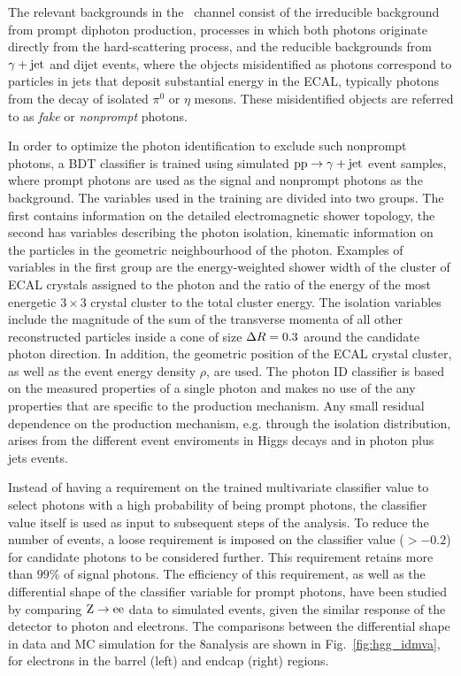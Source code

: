 \documentclass[11pt,twoside,a4paper,cmspaper,final,collab]{cms-tdr}
\begin{document}
The relevant backgrounds in the  \HGG\ channel consist of the irreducible background
from prompt diphoton production, \ie processes in which both photons originate directly
from the hard-scattering process, and the reducible
backgrounds from $\gamma + \text{jet}$ and dijet events,
where the objects misidentified
as photons
correspond to particles in jets that deposit substantial energy in the ECAL, typically photons from
the decay of isolated $\pi^0$ or $\eta$ mesons.
These misidentified objects are referred to as \emph{fake} or \emph{nonprompt} photons.

In order to optimize the photon identification to exclude such nonprompt
photons, a BDT classifier is trained using simulated $\mathrm{p}\mathrm{p}\to\gamma + \text{jet}$ event samples,
where prompt photons are used as the signal and nonprompt photons as the background.
The variables used in the training are divided into two groups.
The first contains information on the detailed electromagnetic shower topology,
the second has variables describing the photon isolation, \ie kinematic information on the
particles in the geometric neighbourhood of the photon. Examples of variables in the first group are the
energy-weighted shower width of the cluster of ECAL crystals assigned to the photon and the ratio of the
energy of the  most energetic $3\times3$ crystal cluster to the total cluster energy.
The isolation variables include  the magnitude of the sum of the transverse  momenta
of all other reconstructed particles inside a cone of size $\Delta R=0.3$ around the candidate photon direction.
In addition, the
geometric position of the ECAL crystal cluster, as well as the event energy density
$\rho$,
are used.
The photon ID classifier is based on the measured properties of a single photon and makes no use of the 
any properties that are specific to the production mechanism. 
Any small residual dependence on the production mechanism, e.g. through the isolation distribution, 
arises from the different event enviroments in Higgs decays and in photon plus jets events. 

Instead of having a requirement on the trained multivariate classifier value to select photons
with a high probability of being prompt photons, the classifier value itself is used
as input to subsequent steps of the analysis. To reduce the number of events, a loose requirement
is imposed on the  classifier value (${>}-0.2$) for candidate photons to be considered further.
This requirement retains more than $99\%$ of signal photons.
The efficiency of this requirement, as well as the differential shape of the classifier
variable for prompt photons, have been studied by comparing $\mathrm{Z}\to \mathrm{e}\mathrm{e}$
data to simulated events,  given the similar response of the detector to photon and electrons.
The comparisons between the differential shape in data and MC simulation for the 8\TeV analysis
are shown in Fig.~\ref{fig:hgg_idmva},
for electrons in the barrel (left) and endcap (right) regions.
\end{document}
